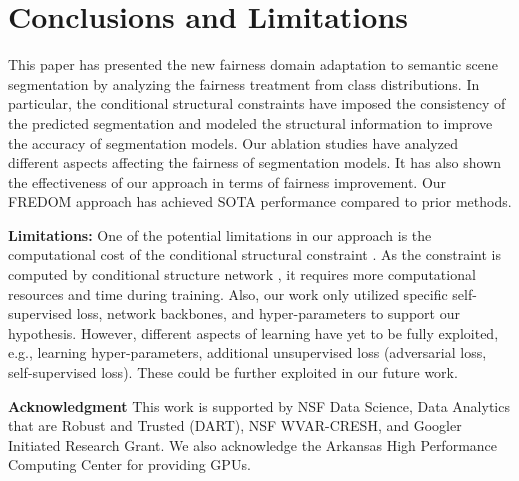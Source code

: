 \documentclass[10pt,twocolumn,letterpaper]{article}
\begin{document}
\vspace{-2mm}
\section{Conclusions and Limitations}
\vspace{-2mm}

This paper has presented the new fairness domain adaptation to semantic scene segmentation by analyzing the fairness treatment from class distributions. In particular, the conditional structural constraints have imposed the consistency of the predicted segmentation and modeled the structural information to improve the accuracy of segmentation models. Our ablation studies have analyzed different aspects affecting the fairness of segmentation models. It has also shown the effectiveness of our approach in terms of fairness improvement. Our FREDOM approach has achieved SOTA performance compared to prior methods.


\noindent \textbf{Limitations: }  One of the potential limitations in our approach is the computational cost of the conditional structural constraint . As the constraint is computed by conditional structure network , it requires more computational resources and time during training. Also, our work only utilized specific self-supervised loss, network backbones, and hyper-parameters to support our hypothesis. However, different aspects of learning have yet to be fully exploited, e.g., learning hyper-parameters, additional unsupervised loss  (adversarial loss, self-supervised loss). These could be further exploited in our future work.

\small{
\noindent
\textbf{Acknowledgment} 
This work is supported by NSF Data Science, Data Analytics that are Robust and Trusted (DART), NSF WVAR-CRESH, and Googler Initiated Research Grant. We also acknowledge the Arkansas High Performance Computing Center for providing GPUs.
}
{\small


}
\end{document}
